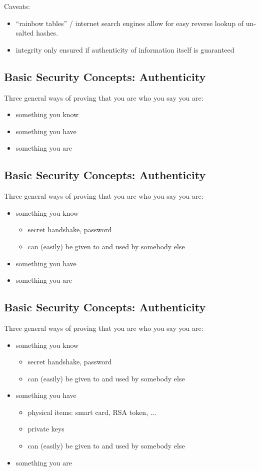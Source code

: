 \documentclass[xga]{xdvislides}
\begin{document}
Caveats:
\begin{itemize}
	\item ``rainbow tables'' / internet search engines allow for easy reverse
		lookup of un-salted hashes.
	\item integrity only ensured if authenticity of information itself is
		guaranteed
\end{itemize}

\subsection{Basic Security Concepts: Authenticity}
Three general ways of proving that you are who you say you are:
\begin{itemize}
	\item something you know
	\item something you have
	\item something you are
\end{itemize}

\subsection{Basic Security Concepts: Authenticity}
Three general ways of proving that you are who you say you are:
\begin{itemize}
	\item something you know
		\begin{itemize}
			\item secret handshake, password
			\item can (easily) be given to and used by somebody else
		\end{itemize}
	\item something you have
	\item something you are
\end{itemize}

\subsection{Basic Security Concepts: Authenticity}
Three general ways of proving that you are who you say you are:
\begin{itemize}
	\item something you know
		\begin{itemize}
			\item secret handshake, password
			\item can (easily) be given to and used by somebody else
		\end{itemize}
	\item something you have
		\begin{itemize}
			\item physical items: smart card, RSA token, ...
			\item private keys
			\item can (easily) be given to and used by somebody else
		\end{itemize}
	\item something you are
\end{itemize}
\end{document}
